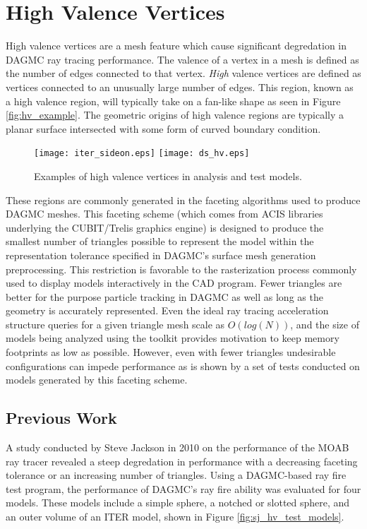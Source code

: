 

\chapter{High Valence Vertices}\label{ch:high_valence}

High valence vertices are a mesh feature which cause significant degredation in
DAGMC ray tracing performance. The valence of a vertex in a mesh is defined as
the number of edges connected to that vertex. \textit{High} valence vertices are
defined as vertices connected to an unusually large number of edges. This
region, known as a high valence region, will typically take on a fan-like shape
as seen in Figure \ref{fig:hv_example}.  The geometric origins of high valence
regions are typically a planar surface intersected with some form of curved
boundary condition. 

\begin{figure}[H]
  \centering
  \texttt{[image: iter\_sideon.eps]}
  \texttt{[image: ds\_hv.eps]}
  \caption{Examples of high valence vertices in analysis and test models.}
  \label{fig:hv_examples}
\end{figure}

These regions are commonly generated in the faceting algorithms used to produce
DAGMC meshes. This faceting scheme (which comes from ACIS libraries underlying
the CUBIT/Trelis graphics engine) is designed to produce the smallest number of
triangles possible to represent the model within the representation tolerance
specified in DAGMC's surface mesh generation preprocessing. This restriction is
favorable to the rasterization process commonly used to display models
interactively in the CAD program. Fewer triangles are better for the purpose
particle tracking in DAGMC as well as long as the geometry is accurately
represented. Even the ideal ray tracing acceleration structure queries for a
given triangle mesh scale as $O(log(N))$, and the size of models being analyzed
using the toolkit provides motivation to keep memory footprints as low as
possible. However, even with fewer triangles undesirable configurations can
impede performance as is shown by a set of tests conducted on models generated
by this faceting scheme.

\section{Previous Work}

A study conducted by Steve Jackson in 2010 on the performance of the MOAB ray
tracer revealed a steep degredation in performance with a decreasing faceting
tolerance or an increasing number of triangles. Using a DAGMC-based ray fire
test program, the performance of DAGMC's ray fire ability was evaluated for four
models. These models include a simple sphere, a notched or slotted sphere, and
an outer volume of an ITER model, shown in Figure \ref{fig:sj_hv_test_models}.

